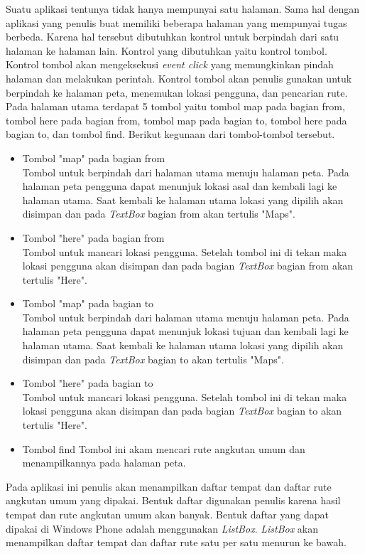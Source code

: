 Suatu aplikasi tentunya tidak hanya mempunyai satu halaman. Sama hal dengan aplikasi yang penulis buat memiliki beberapa halaman yang mempunyai tugas berbeda. Karena hal tersebut dibutuhkan kontrol untuk berpindah dari satu halaman ke halaman lain. Kontrol yang dibutuhkan yaitu kontrol tombol. Kontrol tombol akan mengeksekusi \textit{event click} yang memungkinkan pindah halaman dan melakukan perintah. Kontrol tombol akan penulis gunakan untuk berpindah ke halaman peta, menemukan lokasi pengguna, dan pencarian rute. Pada halaman utama terdapat 5 tombol yaitu tombol map pada bagian from, tombol here pada bagian from, tombol map pada bagian to, tombol here pada bagian to, dan tombol find. Berikut kegunaan dari tombol-tombol tersebut.
\begin{itemize}
	\item Tombol "map" pada bagian from\\
	Tombol untuk berpindah dari halaman utama menuju halaman peta. Pada halaman peta pengguna dapat menunjuk lokasi asal dan kembali lagi ke halaman utama. Saat kembali ke halaman utama lokasi yang dipilih akan disimpan dan pada \textit{TextBox} bagian from akan tertulis "Maps".
	\item Tombol "here" pada bagian from\\
	Tombol untuk mancari lokasi pengguna. Setelah tombol ini di tekan maka lokasi pengguna akan disimpan dan pada bagian \textit{TextBox} bagian from akan tertulis "Here".
	\item Tombol "map" pada bagian to\\
	Tombol untuk berpindah dari halaman utama menuju halaman peta. Pada halaman peta pengguna dapat menunjuk lokasi tujuan dan kembali lagi ke halaman utama. Saat kembali ke halaman utama lokasi yang dipilih akan disimpan dan pada \textit{TextBox} bagian to akan tertulis "Maps".
	\item Tombol "here" pada bagian to\\
	Tombol untuk mancari lokasi pengguna. Setelah tombol ini di tekan maka lokasi pengguna akan disimpan dan pada bagian \textit{TextBox} bagian to akan tertulis "Here".
	\item Tombol find 
	Tombol ini akam mencari rute angkutan umum dan menampilkannya pada halaman peta.
\end{itemize}

Pada aplikasi ini penulis akan menampilkan daftar tempat dan daftar rute angkutan umum yang dipakai. Bentuk daftar digunakan penulis karena hasil tempat dan rute angkutan umum akan banyak. Bentuk daftar yang dapat dipakai di Windows Phone adalah menggunakan \textit{ListBox}. \textit{ListBox} akan menampilkan daftar tempat dan daftar rute satu per satu menurun ke bawah.

